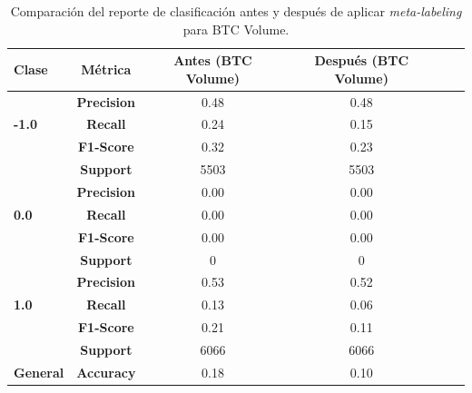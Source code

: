 \documentclass[a4paper,12pt, twoside]{report}
\begin{document}
\begin{table}[h!]
    \centering
    \begin{tabular}{lccccc}
    \hline
    \textbf{Clase} & \textbf{Métrica} & \textbf{Antes (BTC Volume)} & \textbf{Después (BTC Volume)} \\
    \hline
    \multirow{3}{*}{\textbf{-1.0}} & \textbf{Precision} & 0.48 & 0.48 \\
                                    & \textbf{Recall}    & 0.24 & 0.15 \\
                                    & \textbf{F1-Score}  & 0.32 & 0.23 \\
                                    & \textbf{Support}   & 5503 & 5503 \\
    \hline
    \multirow{3}{*}{\textbf{0.0}} & \textbf{Precision}  & 0.00 & 0.00 \\
                                    & \textbf{Recall}     & 0.00 & 0.00 \\
                                    & \textbf{F1-Score}   & 0.00 & 0.00 \\
                                    & \textbf{Support}    & 0 & 0 \\
    \hline
    \multirow{3}{*}{\textbf{1.0}} & \textbf{Precision}  & 0.53 & 0.52 \\
                                    & \textbf{Recall}     & 0.13 & 0.06 \\
                                    & \textbf{F1-Score}   & 0.21 & 0.11 \\
                                    & \textbf{Support}    & 6066 & 6066 \\
    \hline
    \textbf{General} & \textbf{Accuracy} & 0.18 & 0.10 \\
    \hline
    \end{tabular}
    \caption{Comparación del reporte de clasificación antes y después de aplicar \textit{meta-labeling} para BTC Volume.}
    \label{tab:classification_report_btc_volume}
\end{table}
    
\end{document}
